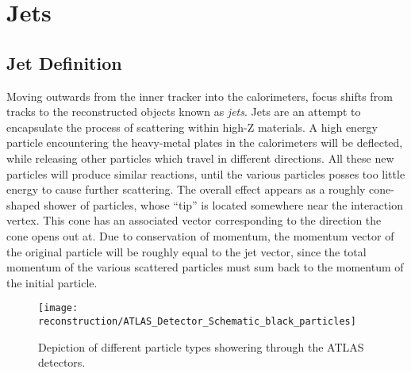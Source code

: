     \FloatBarrier
    \section{Jets}

        \subsection{Jet Definition}

        Moving outwards from the inner tracker into the calorimeters, focus shifts from tracks to the reconstructed objects known as \textit{jets}.
        Jets are an attempt to encapsulate the process of scattering within high-Z materials.
        A high energy particle encountering the heavy-metal plates in the calorimeters will be deflected,
            while releasing other particles which travel in different directions.
        All these new particles will produce similar reactions, until the various particles posses too little energy to cause further scattering.
        The overall effect appears as a roughly cone-shaped shower of particles,
            whose ``tip'' is located somewhere near the interaction vertex.
        This cone has an associated vector corresponding to the direction the cone opens out at.
        Due to conservation of momentum, the momentum vector of the original particle will be roughly equal to the jet vector,
            since the total momentum of the various scattered particles must sum back to the momentum of the initial particle.

        \begin{figure}[tbh]
            \texttt{[image: reconstruction/ATLAS\_Detector\_Schematic\_black\_particles]}
            \caption{
                Depiction of different particle types showering through the ATLAS detectors\cite{Mehlhase:2770815}.
            }
            \label{fig:atlas_shower}
        \end{figure}

